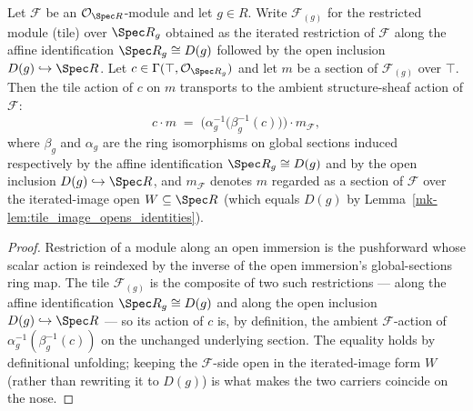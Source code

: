 \begin{lemma}\label{mk-lem:modulesRestrictBasicOpen_smul_eq}
  \leanok

  Let \(\mathcal{F}\) be an \(\mathcal{O}_{\Spec R}\)-module and let \(g \in R\). Write
  \(\mathcal{F}_{(g)}\) for the restricted module (tile) over \(\Spec R_g\) obtained as the iterated
  restriction of \(\mathcal{F}\) along the affine identification \(\Spec R_g \cong D(g)\) followed by the
  open inclusion \(D(g) \hookrightarrow \Spec R\). Let \(c \in \Gamma(\top, \mathcal{O}_{\Spec R_g})\) and
  let \(m\) be a section of \(\mathcal{F}_{(g)}\) over \(\top\). Then the tile action of \(c\) on \(m\)
  transports to the ambient structure-sheaf action of \(\mathcal{F}\):
  \[
    c \cdot m \;=\; \bigl(\alpha_g^{-1}\bigl(\beta_g^{-1}(c)\bigr)\bigr) \cdot m_{\mathcal{F}},
  \]
  where \(\beta_g\) and \(\alpha_g\) are the ring isomorphisms on global sections induced respectively by
  the affine identification \(\Spec R_g \cong D(g)\) and by the open inclusion \(D(g) \hookrightarrow
  \Spec R\), and \(m_{\mathcal{F}}\) denotes \(m\) regarded as a section of \(\mathcal{F}\) over the
  iterated-image open \(W \subseteq \Spec R\) (which equals \(D(g)\) by
  Lemma~\ref{mk-lem:tile_image_opens_identities}).
\end{lemma}
\begin{proof}
  \leanok
  Restriction of a module along an open immersion is the pushforward whose scalar action is reindexed by
  the inverse of the open immersion's global-sections ring map. The tile \(\mathcal{F}_{(g)}\) is the
  composite of two such restrictions --- along the affine identification \(\Spec R_g \cong D(g)\) and along
  the open inclusion \(D(g) \hookrightarrow \Spec R\) --- so its action of \(c\) is, by definition, the
  ambient \(\mathcal{F}\)-action of \(\alpha_g^{-1}(\beta_g^{-1}(c))\) on the unchanged underlying section.
  The equality holds by definitional unfolding; keeping the \(\mathcal{F}\)-side open in the
  iterated-image form \(W\) (rather than rewriting it to \(D(g)\)) is what makes the two carriers
  coincide on the nose.
\end{proof}

